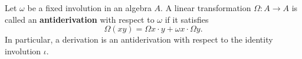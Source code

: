 Let $\omega$ be a fixed involution in an algebra $A$. A linear transformation $\Omega: A \to A$ is called an \textbf{antiderivation} with respect to $\omega$ if it satisfies
$$
\Omega(xy) = \Omega x \cdot y + \omega x \cdot \Omega y.
$$
In particular, a derivation is an antiderivation with respect to the identity involution $\iota$.
